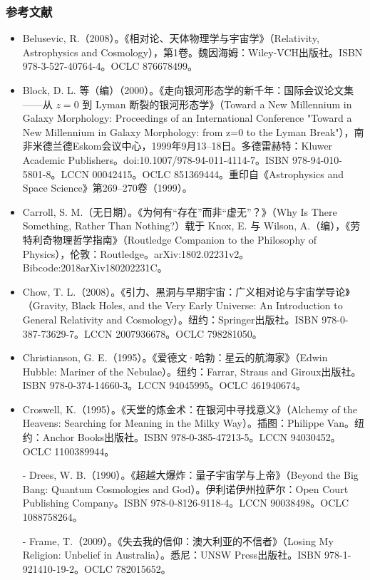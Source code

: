 \subsubsection{参考文献}
\begin{itemize}
\item Belusevic, R.（2008）。《相对论、天体物理学与宇宙学》（Relativity, Astrophysics and Cosmology），第1卷。魏因海姆：Wiley-VCH出版社。ISBN 978-3-527-40764-4。OCLC 876678499。  
\item Block, D. L. 等（编）（2000）。《走向银河形态学的新千年：国际会议论文集——从 $z=0$ 到 Lyman 断裂的银河形态学》（Toward a New Millennium in Galaxy Morphology: Proceedings of an International Conference "Toward a New Millennium in Galaxy Morphology: from z=0 to the Lyman Break"），南非米德兰德Eskom会议中心，1999年9月13–18日。多德雷赫特：Kluwer Academic Publishers。doi:10.1007/978-94-011-4114-7。ISBN 978-94-010-5801-8。LCCN 00042415。OCLC 851369444。重印自《Astrophysics and Space Science》第269–270卷（1999）。  
\item Carroll, S. M.（无日期）。《为何有“存在”而非“虚无”？》（Why Is There Something, Rather Than Nothing?）载于 Knox, E. 与 Wilson, A.（编），《劳特利奇物理哲学指南》（Routledge Companion to the Philosophy of Physics），伦敦：Routledge。arXiv:1802.02231v2。Bibcode:2018arXiv180202231C。  
\item Chow, T. L.（2008）。《引力、黑洞与早期宇宙：广义相对论与宇宙学导论》（Gravity, Black Holes, and the Very Early Universe: An Introduction to General Relativity and Cosmology）。纽约：Springer出版社。ISBN 978-0-387-73629-7。LCCN 2007936678。OCLC 798281050。  
\item Christianson, G. E.（1995）。《爱德文·哈勃：星云的航海家》（Edwin Hubble: Mariner of the Nebulae）。纽约：Farrar, Straus and Giroux出版社。ISBN 978-0-374-14660-3。LCCN 94045995。OCLC 461940674。  
\item Croswell, K.（1995）。《天堂的炼金术：在银河中寻找意义》（Alchemy of the Heavens: Searching for Meaning in the Milky Way）。插图：Philippe Van。纽约：Anchor Books出版社。ISBN 978-0-385-47213-5。LCCN 94030452。OCLC 1100389944。  

- Drees, W. B.（1990）。《超越大爆炸：量子宇宙学与上帝》（Beyond the Big Bang: Quantum Cosmologies and God）。伊利诺伊州拉萨尔：Open Court Publishing Company。ISBN 978-0-8126-9118-4。LCCN 90038498。OCLC 1088758264。  

- Frame, T.（2009）。《失去我的信仰：澳大利亚的不信者》（Losing My Religion: Unbelief in Australia）。悉尼：UNSW Press出版社。ISBN 978-1-921410-19-2。OCLC 782015652。  


\end{itemize}
